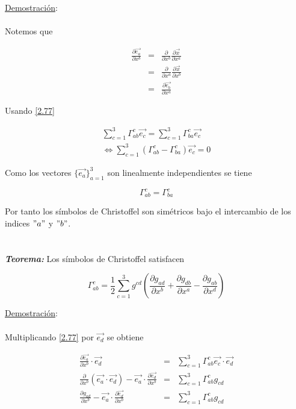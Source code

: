 \documentclass[12pt]{report}
\begin{document}
\underline{Demostración}: \\
\\


Notemos que 

\begin{eqnarray} \nonumber
\frac{\partial \vec{e_a}}{\partial x^b}&=& \frac{\partial}{\partial x^b} \frac{\partial \vec{x}}{\partial x^a} \\ \nonumber
&=& \frac{\partial}{\partial x^a} \frac{\partial \vec{x}}{\partial x^b} \\ \label{2.79}
&=& \frac{\partial \vec{e_b}}{\partial x^a}  
\end{eqnarray}

Usando \eqref{2.77}

\begin{eqnarray} \nonumber
\displaystyle\sum_{c=1}^3 \Gamma_{ab}^c \vec{e_c}=\displaystyle\sum_{c=1}^3 \Gamma_{ba}^c \vec{e_c} \\ \nonumber
\Leftrightarrow \displaystyle\sum_{c=1}^3 (\Gamma_{ab}^c - \Gamma_{ba}^c ) \vec{e_c} =0
\end{eqnarray}


Como los vectores $\displaystyle \{ \vec{e_a}\}_{a=1}^3$ son linealmente independientes se tiene 

\begin{equation} \label{2.80}
\Gamma_{ab}^c = \Gamma_{ba}^c
\end{equation}

Por tanto los símbolos de Christoffel son simétricos bajo el intercambio de los indices $"a"$ y $"b"$. \\
\\
\\
\textbf{\textit{Teorema:}} Los símbolos de Christoffel satisfacen

\begin{equation} \label{2.81}
\Gamma_{ab}^c = \frac{1}{2} \displaystyle\sum_{c=1}^3 g^{cd} \left( \frac{\partial g_{ad}}{\partial x^b} + \frac{\partial g_{db}}{\partial x^a} - \frac{\partial g_{ab}}{\partial x^d} \right) 
\end{equation}

\underline{Demostración}: \\
\\

Multiplicando \eqref{2.77} por $\displaystyle \vec{e_d}$ se obtiene

	
\begin{eqnarray} \nonumber
\frac{\partial \vec{e_a}}{\partial x^b} \cdot \vec{e_d} &=& \displaystyle\sum_{c=1}^3 \Gamma_{ab}^c \vec{e_c}\cdot \vec{e_d} \\ \nonumber
\frac{\partial}{\partial x^b}(\vec{e_a}\cdot \vec{e_d})- \vec{e_a} \cdot \frac{\partial \vec{e_d}}{\partial x^b} &=& \displaystyle\sum_{c=1}^3 \Gamma_{ab}^c g_{cd} \\ \nonumber
\frac{\partial g_{ad}}{\partial x^b}- \vec{e_a} \cdot \frac{\partial \vec{e_d}}{\partial x^b} &=& \displaystyle\sum_{c=1}^3 \Gamma_{ab}^c g_{cd} 
\end{eqnarray}
\end{document}
